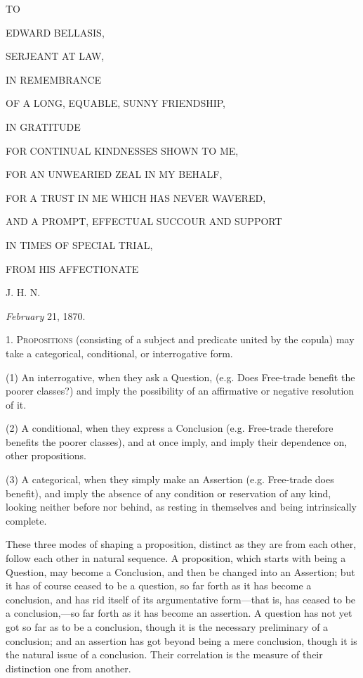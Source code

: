 



TO


EDWARD BELLASIS,


SERJEANT AT LAW,


IN REMEMBRANCE


OF A LONG, EQUABLE, SUNNY FRIENDSHIP,


IN GRATITUDE


FOR CONTINUAL KINDNESSES SHOWN TO ME,


FOR AN UNWEARIED ZEAL IN MY BEHALF,


FOR A TRUST IN ME WHICH HAS NEVER
WAVERED,


AND A PROMPT, EFFECTUAL SUCCOUR AND
SUPPORT


IN TIMES OF SPECIAL TRIAL,




FROM HIS AFFECTIONATE




J. H. N.


\emph{February} 21, 1870.



1. P\textsc{ropositions} (consisting of a subject and predicate united
by the copula) may take a categorical, conditional, or interrogative
form.

(1) An interrogative, when they ask a Question, (e.g. Does
Free-trade benefit the poorer classes?) and imply the possibility of
an affirmative or negative resolution of it.

(2) A conditional, when they express a Conclusion (e.g. Free-trade
therefore benefits the poorer classes), and at once imply, and imply
their dependence on, other propositions.

(3) A categorical, when they simply make an Assertion (e.g.
Free-trade does benefit), and imply the absence of any condition or
reservation of any kind, looking neither before nor behind, as resting
in themselves and being intrinsically complete.

These three modes of shaping a proposition, distinct as they are
from each other, follow each other in natural sequence. A proposition,
which starts with being a Question, may become a Conclusion, and
then be changed into an Assertion; but it has of course ceased to be a
question, so far forth as it has become a conclusion, and has rid
itself of its argumentative form—that is, has ceased to be a
conclusion,—so far forth as it has become an assertion. A question
has not yet got so far as to be a conclusion, though it is the
necessary preliminary of a conclusion; and an assertion has got beyond
being a mere conclusion, though it is the natural issue of a
conclusion. Their correlation is the measure of their distinction one
from another.

